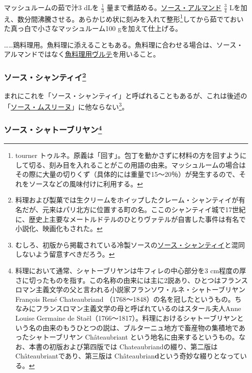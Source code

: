 \begin{recette}
マッシュルームの茹で汁3 dLを \(\frac{1}{3}\)
量まで煮詰める。\protect\hyperlink{sauce-allemande}{ソース・アルマンド}
\(\frac{3}{4}\)
Lを加え、数分間沸騰させる。あらかじめ状に刻みを入れて整形\footnote{tourner
  トゥルネ。原義は「回す」。包丁を動かさずに材料の方を回すようにして切る、刻み目を入れることがこの用語の由来。マッシュルームの場合はその際に大量の切りくず（具体的には重量で15〜20％）が発生するので、それをソースなどの風味付けに利用する。}してから茹でておいた真っ白で小さなマッシュルーム100
gを加えて仕上げる。

\ldots{}\ldots{}鶏料理用。魚料理に添えることもある。魚料理に合わせる場合は、ソース・アルマンドではなく\protect\hyperlink{veloute-de-poisson}{魚料理用ヴルテ}を用いること。

\atoaki{}

\hypertarget{sauce-chantilly}{%
\subsubsection[ソース・シャンティイ]{\texorpdfstring{ソース・シャンティイ\footnote{料理および製菓では生クリームをホイップしたクレーム・シャンティイが有名だが、元来はパリ北方に位置する町の名。ここのシャンティイ城で17世紀に、歴史上主要なメートルドテルのひとりヴァテルが自害した事件は有名で小説化、映画化もされた。}}{ソース・シャンティイ}}\label{sauce-chantilly}}


 

まれにこれを「ソース・シャンティイ」と呼ばれることもあるが、これは後述の「\protect\hyperlink{sauce-mousseline}{ソース・ムスリーヌ}」に他ならない\footnote{むしろ、初版から掲載されている冷製ソースの\protect\hyperlink{sauce-chantilly-froide}{ソース・シャンティイ}と混同しないよう留意すべきだろう。}。

\atoaki{}

\hypertarget{sauce-chateaubriand}{%
\subsubsection[ソース・シャトーブリヤン]{\texorpdfstring{ソース・シャトーブリヤン\footnote{料理において通常、シャトーブリヤンは牛フィレの中心部分を3
  cm程度の厚さに切ったものを指す。この名称の由来には主に2説あり、ひとつはフランスロマン主義文学の父と言われる小説家フランソワ・ルネ・シャトーブリヤン
  François René Chateaubriand
  （1768〜1848）の名を冠したというもの。ちなみにフランスロマン主義文学の母と呼ばれているのはスタール夫人Anne
  Louise Germaine de
  Staël（1766〜1817）。料理におけるシャトーブリヤンという名の由来のもうひとつの説は、ブルターニュ地方で畜産物の集積地であったシャトーブリヤン
  Châteaubriant
  という地名に由来するというもの。なお、本書の初版および第四版では
  Chateaubriandの綴り、第二版はChâteaubriantであり、第三版は
  Châteaubrian\textbf{d}という奇妙な綴りとなっている。}}{ソース・シャトーブリヤン}}\label{sauce-chateaubriand}}


\end{recette}
